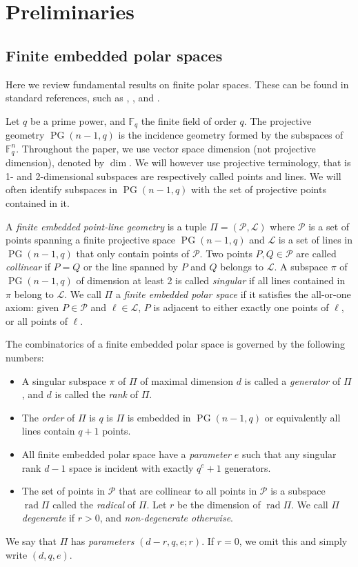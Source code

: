 \documentclass[a4paper]{article}
\theoremstyle{definition}
\newcommand{\FF}{\mathbb F}
\newcommand{\fq}{\FF_q}
\DeclareMathOperator{\rad}{rad}
\newcommand{\ml}{\mathcal L}
\renewcommand{\mp}{\mathcal P}
\DeclareMathOperator{\PG}{PG}
\newcommand{\pg}{\PG}
\begin{document}
\section{Preliminaries}

\subsection{Finite embedded polar spaces}

Here we review fundamental results on finite polar spaces.
These can be found in standard references, such as \cite[Chapter 2]{Brouwer:VanMaldeghem}, \cite[Chapters 6, 7]{Cameron}, and \cite[Chapters 1,2]{Hirschfeld:Thas}.

Let $q$ be a prime power, and $\fq$ the finite field of order $q$.
The projective geometry $\pg(n-1,q)$ is the incidence geometry formed by the subspaces of $\FF_q^n$.
Throughout the paper, we use vector space dimension (not projective dimension), denoted by $\dim$.
We will however use projective terminology, that is 1- and 2-dimensional subspaces are respectively called points and lines.
We will often identify subspaces in $\pg(n-1,q)$ with the set of projective points contained in it.

A \emph{finite embedded point-line geometry} is a tuple $\Pi = (\mp,\ml)$ where $\mp$ is a set of points spanning a finite projective space $\pg(n-1,q)$ and $\ml$ is a set of lines in $\pg(n-1,q)$ that only contain points of $\mp$.
Two points $P,Q \in \mp$ are called \emph{collinear} if $P = Q$ or the line spanned by $P$ and $Q$ belongs to $\ml$.
A subspace $\pi$ of $\pg(n-1,q)$ of dimension at least 2 is called \emph{singular} if all lines contained in $\pi$ belong to $\ml$.
We call $\Pi$ a \emph{finite embedded polar space} if it satisfies the all-or-one axiom: given $P \in \mp$ and $\ell \in \ml$, $P$ is adjacent to either exactly one points of $\ell$, or all points of $\ell$.

The combinatorics of a finite embedded polar space is governed by the following numbers:
\begin{itemize}
 \item A singular subspace $\pi$ of $\Pi$ of maximal dimension $d$ is called a \emph{generator} of $\Pi$, and $d$ is called the \emph{rank} of $\Pi$.
 \item The \emph{order} of $\Pi$ is $q$ is $\Pi$ is embedded in $\pg(n-1,q)$ or equivalently all lines contain $q+1$ points.
 \item All finite embedded polar space have a \emph{parameter} $e$ such that any singular rank $d-1$ space is incident with exactly $q^e+1$ generators.
 \item The set of points in $\mp$ that are collinear to all points in $\mp$ is a subspace $\rad \Pi$ called the \emph{radical} of $\Pi$.
 Let $r$ be the dimension of $\rad \Pi$.
 We call $\Pi$ \emph{degenerate} if $r > 0$, and \emph{non-degenerate otherwise}.
\end{itemize}
We say that $\Pi$ has \emph{parameters} $(d-r,q,e;r)$.
If $r=0$, we omit this and simply write $(d,q,e)$.
\end{document}
